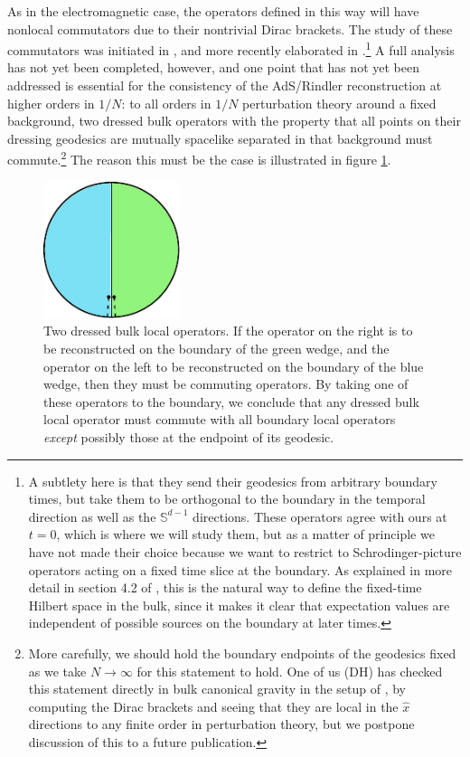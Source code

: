 \documentclass[12pt]{article}
\begin{document}
As in the electromagnetic case, the operators defined in this way will have nonlocal commutators due to their nontrivial Dirac brackets.  The study of these commutators was initiated in \cite{Heemskerk:2012mn}, and more recently elaborated in \cite{Kabat:2013wga}.\footnote{A subtlety here is that they send their geodesics from arbitrary boundary times, but take them to be orthogonal to the boundary in the temporal direction as well as the $\mathbb{S}^{d-1}$ directions. These operators agree with ours at $t=0$, which is where we will study them, but as a matter of principle we have not made their choice because we want to restrict to Schrodinger-picture operators acting on a fixed time slice at the boundary.  As explained in more detail in section 4.2 of \cite{Heemskerk:2012mn}, this is the natural way to define the fixed-time Hilbert space in the bulk, since it makes it clear that expectation values are independent of possible sources on the boundary at later times.}  A full analysis has not yet been completed, however, and one point that has not yet been addressed is essential for the consistency of the AdS/Rindler reconstruction at higher orders in $1/N$: to all orders in $1/N$ perturbation theory around a fixed background, two dressed bulk operators with the property that all points on their dressing geodesics are mutually spacelike separated in that background must commute.\footnote{More carefully, we should hold the boundary endpoints of the geodesics fixed as we take $N\to\infty$ for this statement to hold.  One of us (DH) has checked this statement directly in bulk canonical gravity in the setup of \cite{Kabat:2013wga}, by computing the Dirac brackets and seeing that they are local in the $\hat{x}$ directions to any finite order in perturbation theory, but we postpone discussion of this to a future publication.}  The reason this must be the case is illustrated in figure \ref{commutatorfig}.
\begin{figure}
\begin{center}
\includegraphics[height=4cm]{commutatorfig.pdf}
\caption{Two dressed bulk local operators.  If the operator on the right is to be reconstructed on the boundary of the green wedge, and the operator on the left to be reconstructed on the boundary of the blue wedge, then they must be commuting operators.  By taking one of these operators to the boundary, we conclude that any dressed bulk local operator must commute with all boundary local operators \textit{except} possibly those at the endpoint of its geodesic.}\label{commutatorfig}
\end{center}
\end{figure}
\end{document}
